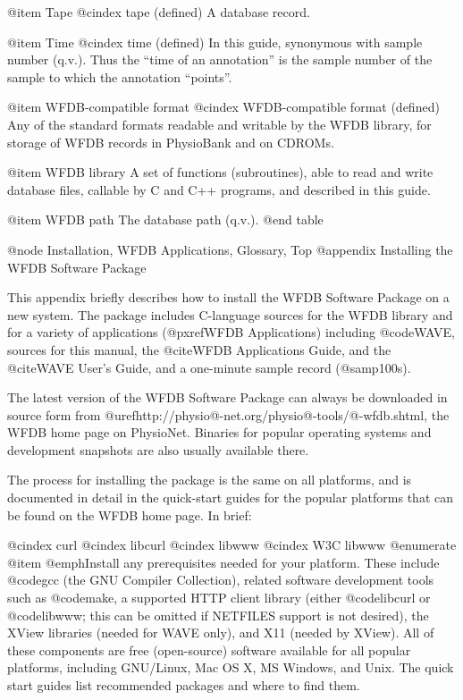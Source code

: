 {{{{{{{{@item Tape
@cindex tape (defined)
A database record.

@item Time
@cindex time (defined)
In this guide, synonymous with sample number (q.v.).  Thus the ``time of
an annotation'' is the sample number of the sample to which the
annotation ``points''.

@item WFDB-compatible format
@cindex WFDB-compatible format (defined)
Any of the standard formats readable and writable by the WFDB library,
for storage of WFDB records in PhysioBank and on CDROMs.

@item WFDB library
A set of functions (subroutines), able to read and write database files,
callable by C and C++ programs, and described in this guide.

@item WFDB path
The database path (q.v.).
@end table

@node     Installation, WFDB Applications, Glossary, Top
@appendix Installing the WFDB Software Package

This appendix briefly describes how to install the WFDB Software Package
on a new system.  The package includes C-language sources for the WFDB
library and for a variety of applications (@pxref{WFDB Applications}) including
@code{WAVE}, sources for this manual, the @cite{WFDB Applications Guide}, and
the @cite{WAVE User's Guide}, and a one-minute sample record (@samp{100s}).

The latest version of the WFDB Software Package can always be downloaded in
source form from @uref{http://physio@-net.org/physio@-tools/@-wfdb.shtml},
the WFDB home page on PhysioNet.  Binaries for popular operating systems and
development snapshots are also usually available there.

The process for installing the package is the same on all platforms, and
is documented in detail in the quick-start guides for the popular platforms
that can be found on the WFDB home page.  In brief:

@cindex curl
@cindex libcurl
@cindex libwww
@cindex W3C libwww
@enumerate
@item
@emph{Install any prerequisites needed for your platform.}  These include
@code{gcc} (the GNU Compiler Collection), related software development tools
such as @code{make}, a supported HTTP client library (either @code{libcurl} or
@code{libwww}; this can be omitted if NETFILES support is not desired), the
XView libraries (needed for WAVE only), and X11 (needed by XView). All of these
components are free (open-source) software available for all popular platforms,
including GNU/Linux, Mac OS X, MS Windows, and Unix.  The quick start guides
list recommended packages and where to find them.

}}}}}}}}
